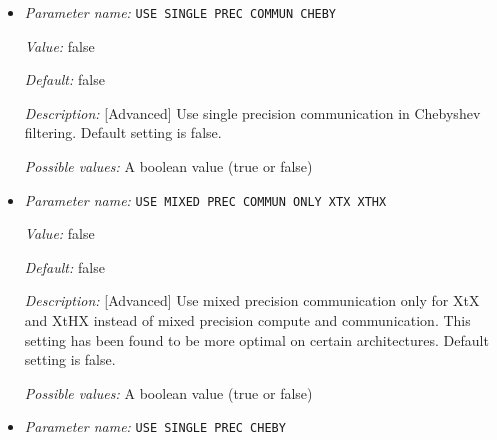 \begin{itemize}
{\it Value:} false


{\it Default:} false


{\it Description:} [Advanced] Use mixed precision arithmetic in subspace rotation step of CGS orthogonalization, if ORTHOGONALIZATION TYPE is set to CGS. Default setting is false.


{\it Possible values:} A boolean value (true or false)
\item {\it Parameter name:} {\tt USE SINGLE PREC COMMUN CHEBY}
\label{parameters:SCF parameters/Eigen_2dsolver parameters/USE USE SINGLE PREC COMMUN CHEBY}
\label{parameters:SCF_20parameters/Eigen_2dsolver_20parameters/USE_20SINGLE_20PREC_20COMMUN_20CHEBY}


{\it Value:} false


{\it Default:} false


{\it Description:} [Advanced] Use single precision communication in Chebyshev filtering. Default setting is false.


{\it Possible values:} A boolean value (true or false)
\item {\it Parameter name:} {\tt USE MIXED PREC COMMUN ONLY XTX XTHX}
\label{parameters:SCF parameters/Eigen_2dsolver parameters/USE MIXED PREC COMMUN ONLY XTX XTHX}
\label{parameters:SCF_20parameters/Eigen_2dsolver_20parameters/USE_20MIXED_20PREC_20COMMUN_20ONLY_20XTX_20XTHX}


{\it Value:} false


{\it Default:} false


{\it Description:} [Advanced] Use mixed precision communication only for XtX and XtHX instead of mixed precision compute and communication. This setting has been found to be more optimal on certain architectures. Default setting is false.


{\it Possible values:} A boolean value (true or false)
\item {\it Parameter name:} {\tt USE SINGLE PREC CHEBY}
\label{parameters:SCF parameters/Eigen_2dsolver parameters/USE USE SINGLE PREC CHEBY}
\label{parameters:SCF_20parameters/Eigen_2dsolver_20parameters/USE_20SINGLE_20PREC_20CHEBY}



\end{itemize}
